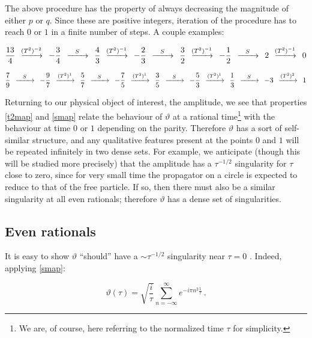 \documentclass{article}
\newcommand{\T}{\ensuremath{\vartheta}}
\newcommand{\sumZ}{\sum_{n=-\infty}^{\infty}}
\begin{document}
The above procedure has the property of always decreasing the magnitude of either $p$ or $q$. Since these are positive integers, iteration of the procedure has to reach $0$ or $1$ in a finite number of steps. A couple examples:

\newcommand{\sapp}{\,\;\ensuremath{\xrightarrow{\mathmakebox[2em]{S}}}\;\,}
\newcommand{\tapp}[1]{\,\;\xrightarrow{\mathmakebox[2em]{(T^2)^{#1}}}\;\,}

\begin{equation}
    \frac{13}{4} \tapp{-2} - \frac{3}{4} \sapp \frac{4}{3} \tapp{-1} - \frac{2}{3} \sapp \frac{3}{2} \tapp{-1} -\frac{1}{2} \sapp 2 \tapp{-1} 0
\end{equation}

\begin{equation}
    \frac{7}{9} \sapp - \frac{9}{7} \tapp{1} \frac{5}{7} \sapp -\frac{7}{5} \tapp{1} \frac{3}{5} \sapp - \frac{5}{3} \tapp{1} \frac{1}{3} \sapp -3 \tapp{2} 1
\end{equation}

Returning to our physical object of interest, the amplitude, we see that properties \eqref{t2map} and \eqref{smap} relate the behaviour of $\T$ at a rational time\footnote{We are, of course, here referring to the normalized time $\tau$ for simplicity.} with the behaviour at time $0$ or $1$ depending on the parity. Therefore $\T$ has a sort of self-similar structure, and any qualitative features present at the points $0$ and $1$ will be repeated infinitely in two dense sets. For example, we anticipate (though this will be studied more precisely) that the amplitude has a $\tau^{-1/2}$ singularity for $\tau$ close to zero, since for very small time the propagator on a circle is expected to reduce to that of the free particle. If so, then there must also be a similar singularity at all even rationals; therefore $\T$ has a dense set of singularities.


\subsection{Even rationals}\label{sec:evens}

It is easy to show $\T$ ``should'' have a $\sim \tau^{-1/2}$ singularity near $\tau = 0$ \cite{boxpdf}. Indeed, applying  \eqref{smap}:

\begin{equation}
    \vartheta(\tau) = \sqrt{\frac{i}{\tau}} \sumZ e^{-i\pi n^2 \frac{1}{\tau}}\,.
\end{equation}
\end{document}
